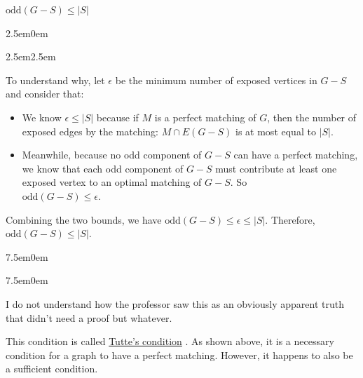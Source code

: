 \documentclass{book}
\newcommand{\hFour}{%
   \color{Cerulean}
   \fontsize{12}{14}\selectfont%
}
\newcommand{\myComment}{%
   \color{RawerSienna}%
   \fontsize{12}{14}\selectfont%
}
\newenvironment{myIndent}{%
   \begin{adjustwidth}{2.5em}{0em}%
}{%
   \end{adjustwidth}%
}
\newenvironment{myTindent}{%
   \begin{adjustwidth}{7.5em}{0em}%
}{%
   \end{adjustwidth}%
}
\newenvironment{myConstrict}{%
   \begin{adjustwidth}{2.5em}{2.5em}%
}{%
   \end{adjustwidth}%
}
\newcommand{\udefine}[1]{%
   \setulcolor{Red}%
   \setul{0.14em}{0.07em}%
   \ul{#1}%
}
\newcommand{\uuline}[2][.]{%
{\vphantom{a}\color{#1}%
\rlap{\rule[-0.18em]{\widthof{#2}}{0.06em}}%
\rlap{\rule[-0.32em]{\widthof{#2}}{0.06em}}}%
#2}
\newcommand{\oddComp}[1]{\mathrm{odd}(#1)}
\newcommand{\retTwo}{\hfill\bigbreak}
\begin{document}
{\centering $\oddComp{G - S} \leq |S|$ \retTwo \par}

{\begin{myIndent} \hFour
   \begin{myConstrict}
      To understand why, let $\epsilon$ be the \uuline{minimum} number of exposed vertices in $G - S$ and consider that:
      \begin{itemize}
         \item We know $\epsilon \leq |S|$ because if $M$ is a perfect matching of $G$, then the number of exposed edges by the matching: $M \cap E(G - S)$ is at most equal to $|S|$. 
         
         \item Meanwhile, because no odd component of $G - S$ can have a perfect matching, we know that each odd component of $G - S$ must contribute at least one exposed vertex to an optimal matching of $G - S$. So\\ $\oddComp{G - S} \leq \epsilon$.
      \end{itemize}
         Combining the two bounds, we have $\oddComp{G - S} \leq \epsilon \leq |S|$. Therefore, $\oddComp{G - S} \leq |S|$.
         
         \begin{myTindent}\begin{myTindent} \myComment
            I do not understand how the professor saw this as an obviously apparent truth that didn't need a proof but whatever.
         \end{myTindent}\end{myTindent}
   \end{myConstrict}
\end{myIndent}}
\retTwo

This condition is called \udefine{Tutte's condition}. As shown above, it is a necessary condition for a graph to have a perfect matching. However, it happens to also be a sufficient condition.
\end{document}
